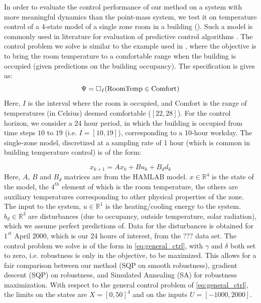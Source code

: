 
In order to evaluate the control performance of our method on a system with more meaningful dynamics than the point-mass system, we test it on temperature control of a 4-state model of a single zone room in a building (\cite{HAMLAB}). Such a model is commonly used in literature for evaluation of predictive control algorithms \cite{AchinACC}. The control problem we solve is similar to the example used in \cite{Raman14_MPCSTL}, where the objective is to bring the room temperature to a comfortable range when the building is occupied (given predictions on the building occupancy). The specification is gives as:
\begin{equation}
\label{eq:BldgSpec}
\Psi = \square_I(\text{RoomTemp} \in \text{Comfort})
\end{equation}
Here, $I$ is the interval where the room is occupied, and $\text{Comfort}$ is the range of temperatures (in Celsius) deemed comfortable ($[22,28]$). For the control horizon, we consider a 24 hour period, in which the building is occupied from time steps $10$ to $19$ (i.e. $I=[10,19]$), corresponding to a 10-hour workday. The single-zone model, discretized at a sampling rate of 1 hour (which is common in building temperature control) is of the form:

\begin{equation}
x_{k+1} = Ax_{k}+Bu_k+B_dd_k
\end{equation}
Here, $A$, $B$ and $B_d$ matrices are from the HAMLAB model. $x \in \mathbb{R}^4$ is the state of the model, the $4^{th}$ element of which is the room temperature, the others are auxiliary temperatures corresponding to other physical properties of the zone. The input to the system, $u \in \mathbb{R}^1$ is the heating/cooling energy to the system. $b_d \in \mathbb{R}^3$ are disturbances (due to occupancy, outside temperature, solar radiation), which we assume perfect predictions of. Data for the disturbances is obtained for $1^{st}$ April 2000, which is our 24 hours of interest, from the ??? data set. The control problem we solve is of the form in \eqref{eq:general_ctrl}, with $\gamma$ and $\delta$ both set to zero, i.e. robustness is only in the objective, to be maximized. This allows for a fair comparison between our method (SQP on smooth robustness), gradient descent (SQP) on robustness, and Simulated Annealing (SA) for robustness maximization. With respect to the general control problem of \eqref{eq:general_ctrl}, the limits on the states are $X=[0,50]^4$ and on the inputs $U=[-1000,2000]$.

